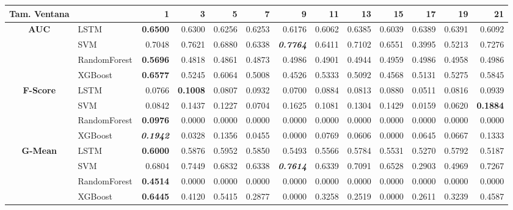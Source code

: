 \begin{table}[H]
	\centering
	\begin{adjustbox}{max width=12cm}
		\begin{tabular}{|c|l|r|r|r|r|r|r|r|r|r|r|r|}
			\hline
			\textbf{Tam. Ventana} &         &      1  &      3  &      5  &      7  &      9  &      11 &      13 &      15 &      17 &      19 &      21 \\
			\hline
			\textbf{AUC} &  LSTM & \textbf{  0.6500 } &  0.6300 &  0.6256 &  0.6253 &  0.6176 &  0.6062 &  0.6385 &  0.6039 &  0.6389 &  0.6391 &  0.6092 \\
			&  SVM &  0.7048 &  0.7621 &  0.6880 &  0.6338 & \textit{ \textbf{  0.7764 } } &  0.6411 &  0.7102 &  0.6551 &  0.3995 &  0.5213 &  0.7276 \\
			&  RandomForest & \textbf{  0.5696 } &  0.4818 &  0.4861 &  0.4873 &  0.4986 &  0.4901 &  0.4944 &  0.4959 &  0.4986 &  0.4958 &  0.4986 \\
			&  XGBoost & \textbf{  0.6577 } &  0.5245 &  0.6064 &  0.5008 &  0.4526 &  0.5333 &  0.5092 &  0.4568 &  0.5131 &  0.5275 &  0.5845 \\
			\hline
			\textbf{F-Score} &  LSTM &  0.0766 & \textbf{  0.1008 } &  0.0807 &  0.0932 &  0.0700 &  0.0884 &  0.0813 &  0.0880 &  0.0511 &  0.0816 &  0.0939 \\
			&  SVM &  0.0842 &  0.1437 &  0.1227 &  0.0704 &  0.1625 &  0.1081 &  0.1304 &  0.1429 &  0.0159 &  0.0620 & \textbf{  0.1884 } \\
			&  RandomForest & \textbf{  0.0976 } &  0.0000 &  0.0000 &  0.0000 &  0.0000 &  0.0000 &  0.0000 &  0.0000 &  0.0000 &  0.0000 &  0.0000 \\
			&  XGBoost & \textit{ \textbf{  0.1942 } } &  0.0328 &  0.1356 &  0.0455 &  0.0000 &  0.0769 &  0.0606 &  0.0000 &  0.0645 &  0.0667 &  0.1333 \\
			\hline
			\textbf{G-Mean} &  LSTM & \textbf{  0.6000 } &  0.5876 &  0.5952 &  0.5850 &  0.5493 &  0.5566 &  0.5784 &  0.5531 &  0.5270 &  0.5792 &  0.5187 \\
			&  SVM &  0.6804 &  0.7449 &  0.6832 &  0.6338 & \textit{ \textbf{  0.7614 } } &  0.6339 &  0.7091 &  0.6528 &  0.2903 &  0.4969 &  0.7267 \\
			&  RandomForest & \textbf{  0.4514 } &  0.0000 &  0.0000 &  0.0000 &  0.0000 &  0.0000 &  0.0000 &  0.0000 &  0.0000 &  0.0000 &  0.0000 \\
			&  XGBoost & \textbf{  0.6445 } &  0.4120 &  0.5415 &  0.2877 &  0.0000 &  0.3258 &  0.2519 &  0.0000 &  0.2611 &  0.3239 &  0.4587 \\

\end{tabular}
\end{adjustbox}
\end{table}
